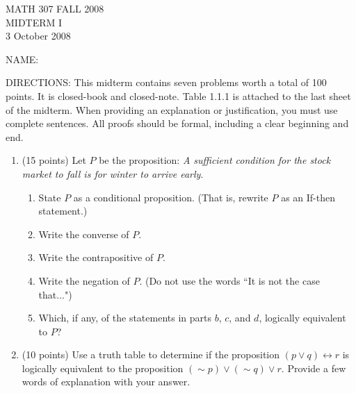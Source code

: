 \documentclass[12pt]{article}
\begin{document}
\begin{center}MATH 307  \: FALL 2008 \\ \textsc{MIDTERM I}\\3 October 2008
\end{center}
 \hfill NAME:\hspace{2in}

\hline
\hline
\smallskip
DIRECTIONS: This midterm contains seven problems worth a total of 100 points. It is closed-book and closed-note. Table 1.1.1 is attached to the last sheet of the midterm. When providing an explanation or justification, you  must use complete sentences. All proofs should be formal, including a clear beginning and end.\\
\smallskip
\hline

\begin{enumerate}
\item (15 points) Let $P$ be the proposition:
 \emph{A sufficient condition for the stock market to fall is for winter to arrive early}.  \\
\begin{enumerate}
\item State $P$ as a conditional proposition. (That is, rewrite $P$ as an If-then statement.)\\
\vfill
\item Write the converse of $P$.\\
\vfill
\item Write the  contrapositive of $P$.\\
\vfill
\item Write the negation of $P.$ (Do not use the words ``It is not the case that...")\\
\vfill
\item Which, if any, of the statements in parts $b$, $c$, and $d$, logically equivalent to $P$?
\vfill
\end{enumerate}
\newpage

\item (10 points) Use a truth table to determine if the proposition $(p \vee q) \leftrightarrow r$ is logically equivalent to the proposition $(\sim p) \vee (\sim q) \vee r.$ Provide a few words of explanation with your answer.\\
    
    \vspace{.3in}
    

\end{enumerate}
\end{document}
